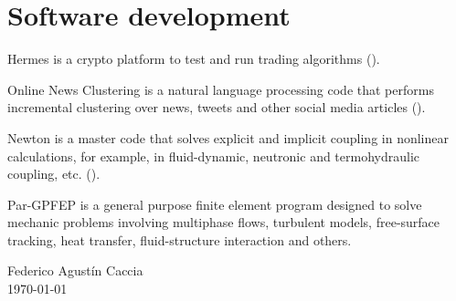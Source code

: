 \documentclass[11pt,a4paper,sans]{moderncv}        %
\begin{document}
{\section{Software development}

{Hermes is a crypto platform to test and run trading algorithms ().}

{Online News Clustering is a natural language processing code that performs incremental clustering over news, tweets and other social media articles ().}

{Newton is a master code that solves explicit and implicit coupling in nonlinear calculations, for example, in fluid-dynamic, neutronic and termohydraulic coupling, etc. ().}

{Par-GPFEP is a general purpose finite element program designed to solve mechanic problems involving multiphase flows, turbulent models, free-surface tracking, heat transfer, fluid-structure interaction and others.}



\vspace{\fill}
\hspace{0.7\linewidth}
\begin{minipage}{0.3\linewidth}
	\begin{center}
		Federico Agustín Caccia\\
		\today
		\bigskip
	\end{center}
\end{minipage}



}
\end{document}
